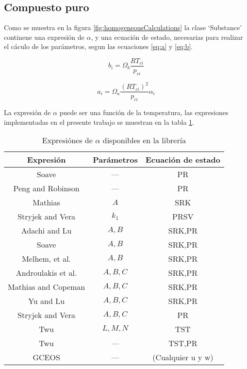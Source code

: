 \subsection{Compuesto puro}

Como se muestra en la figura \ref{fig:homogeneousCalculations} la clase `Substance' continene una expresión de $\alpha$, y una ecuación de estado, necesarias para realizar el cáculo de los parámetros, segun las ecuaciones \ref{eq:a} y \ref{eq:b}. 

\begin{equation}\label{eq:a}
	b_i = \Omega_b \frac{R T_{ci}}{p_{ci}} 
\end{equation}

\begin{equation}\label{eq:b}
 a_i = \Omega_a \frac{\left(R T_{ci}\right)^2}{p_{ci}} \alpha_i
\end{equation}

La expresión de $\alpha$ puede ser una función de la temperatura, las expresiones implementadas en el presente trabajo se muestran en la tabla \ref{tab:alphas}.

\begin{table}
\centering
\begin{tabular}{|c|c|c| }
	\hline
	Expresión & Parámetros & Ecuación de estado\\
	\hline
	Soave    &  ---& PR\\
	Peng and Robinson & ---& PR \\
	Mathias & $A$ & SRK\\
	Stryjek and Vera & $k_1$ & PRSV\\
	Adachi and Lu & $A,B$&SRK,PR\\
	Soave & $A,B$&SRK,PR\\
	Melhem, et al. & $A,B$&SRK,PR\\
	Androulakis et al. & $A,B,C$& SRK,PR\\
	Mathias and Copeman & $A,B,C$& SRK,PR\\
	Yu and Lu & $A,B,C$&SRK,PR\\
	Stryjek and Vera & $A,B,C$&PR\\
	Twu & $L,M,N$&TST\\
	Twu & ---&TST,PR\\
	GCEOS & ---& (Cualquier u y w)\\
	\hline
\end{tabular}
\caption{Expresiónes de $\alpha$ disponibles en la librería}\label{tab:alphas}
\end{table}


